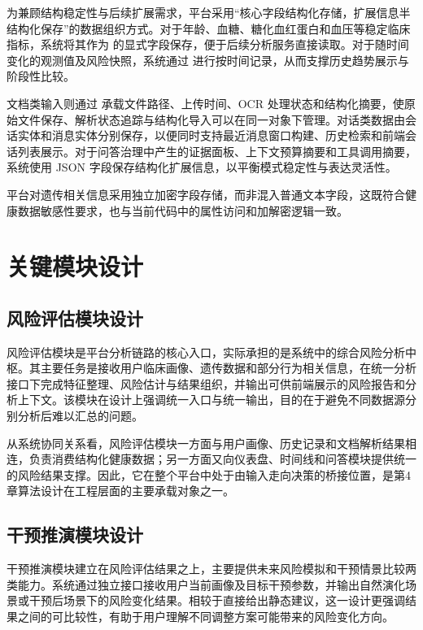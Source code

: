 为兼顾结构稳定性与后续扩展需求，平台采用“核心字段结构化存储，扩展信息半结构化保存”的数据组织方式。对于年龄、血糖、糖化血红蛋白和血压等稳定临床指标，系统将其作为  的显式字段保存，便于后续分析服务直接读取。对于随时间变化的观测值及风险快照，系统通过  进行按时间记录，从而支撑历史趋势展示与阶段性比较。

文档类输入则通过  承载文件路径、上传时间、OCR 处理状态和结构化摘要，使原始文件保存、解析状态追踪与结构化导入可以在同一对象下管理。对话类数据由会话实体和消息实体分别保存，以便同时支持最近消息窗口构建、历史检索和前端会话列表展示。对于问答治理中产生的证据面板、上下文预算摘要和工具调用摘要，系统使用 JSON 字段保存结构化扩展信息，以平衡模式稳定性与表达灵活性。

平台对遗传相关信息采用独立加密字段存储，而非混入普通文本字段，这既符合健康数据敏感性要求，也与当前代码中的属性访问和加解密逻辑一致。

\section{关键模块设计}

\subsection{风险评估模块设计}

风险评估模块是平台分析链路的核心入口，实际承担的是系统中的综合风险分析中枢。其主要任务是接收用户临床画像、遗传数据和部分行为相关信息，在统一分析接口下完成特征整理、风险估计与结果组织，并输出可供前端展示的风险报告和分析上下文。该模块在设计上强调统一入口与统一输出，目的在于避免不同数据源分别分析后难以汇总的问题。

从系统协同关系看，风险评估模块一方面与用户画像、历史记录和文档解析结果相连，负责消费结构化健康数据；另一方面又向仪表盘、时间线和问答模块提供统一的风险结果支撑。因此，它在整个平台中处于由输入走向决策的桥接位置，是第4章算法设计在工程层面的主要承载对象之一。

\subsection{干预推演模块设计}

干预推演模块建立在风险评估结果之上，主要提供未来风险模拟和干预情景比较两类能力。系统通过独立接口接收用户当前画像及目标干预参数，并输出自然演化场景或干预后场景下的风险变化结果。相较于直接给出静态建议，这一设计更强调结果之间的可比较性，有助于用户理解不同调整方案可能带来的风险变化方向。

